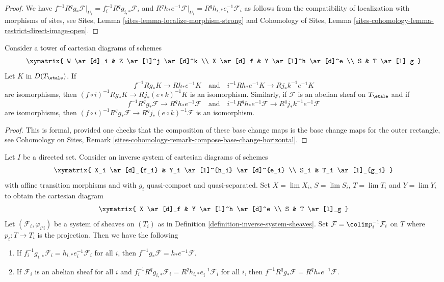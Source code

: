\begin{proof}
We have
$f^{-1}R^qg_*\mathcal{F}|_{U_i} = f_i^{-1}R^qg_{i, *}\mathcal{F}_i$
and
$R^qh_*e^{-1}\mathcal{F}|_{U_i} = R^qh_{i, *}e_i^{-1}\mathcal{F}_i$
as follows from the compatibility of localization with
morphisms of sites, see
Sites, Lemma \ref{sites-lemma-localize-morphism-strong}
and
Cohomology of Sites, Lemma
\ref{sites-cohomology-lemma-restrict-direct-image-open}.
\end{proof}

\begin{lemma}
\label{lemma-base-change-compose}
Consider a tower of cartesian diagrams of schemes
$$
\xymatrix{
W \ar[d]_i & Z \ar[l]^j \ar[d]^k \\
X \ar[d]_f & Y \ar[l]^h \ar[d]^e \\
S & T \ar[l]_g
}
$$
Let $K$ in $D(T_\etale)$. If
$$
f^{-1}Rg_*K \to Rh_*e^{-1}K
\quad\text{and}\quad
i^{-1}Rh_*e^{-1}K \to Rj_*k^{-1}e^{-1}K
$$
are isomorphisms, then
$(f \circ i)^{-1}Rg_*K \to Rj_*(e \circ k)^{-1}K$
is an isomorphism.
Similarly, if $\mathcal{F}$ is an abelian sheaf on $T_\etale$ and if
$$
f^{-1}R^qg_*\mathcal{F} \to R^qh_*e^{-1}\mathcal{F}
\quad\text{and}\quad
i^{-1}R^qh_*e^{-1}\mathcal{F} \to R^qj_*k^{-1}e^{-1}\mathcal{F}
$$
are isomorphisms, then
$(f \circ i)^{-1}R^qg_*\mathcal{F} \to R^qj_*(e \circ k)^{-1}\mathcal{F}$
is an isomorphism.
\end{lemma}

\begin{proof}
This is formal, provided one checks that the composition of these
base change maps is the base change maps for the outer rectangle, see
Cohomology on Sites, Remark
\ref{sites-cohomology-remark-compose-base-change-horizontal}.
\end{proof}

\begin{lemma}
\label{lemma-base-change-Rf-star-colim}
Let $I$ be a directed set. Consider an inverse system of
cartesian diagrams of schemes
$$
\xymatrix{
X_i \ar[d]_{f_i} & Y_i \ar[l]^{h_i} \ar[d]^{e_i} \\
S_i & T_i \ar[l]_{g_i}
}
$$
with affine transition morphisms and with $g_i$ quasi-compact and
quasi-separated. Set $X = \lim X_i$,
$S = \lim S_i$, $T = \lim T_i$ and $Y = \lim Y_i$ to
obtain the cartesian diagram
$$
\xymatrix{
X \ar[d]_f & Y \ar[l]^h \ar[d]^e \\
S & T \ar[l]_g
}
$$
Let $(\mathcal{F}_i, \varphi_{i'i})$ be a system of sheaves on
$(T_i)$ as in Definition \ref{definition-inverse-system-sheaves}. Set
$\mathcal{F} = \colim p_i^{-1}\mathcal{F}_i$ on $T$
where $p_i : T \to T_i$ is the projection.
Then we have the following
\begin{enumerate}
\item If $f_i^{-1}g_{i, *}\mathcal{F}_i = h_{i, *}e_i^{-1}\mathcal{F}_i$
for all $i$, then
$f^{-1}g_*\mathcal{F} = h_*e^{-1}\mathcal{F}$.
\item If $\mathcal{F}_i$ is an abelian sheaf for all $i$ and
$f_i^{-1}R^qg_{i, *}\mathcal{F}_i = R^qh_{i, *}e_i^{-1}\mathcal{F}_i$
for all $i$, then
$f^{-1}R^qg_*\mathcal{F} = R^qh_*e^{-1}\mathcal{F}$.
\end{enumerate}
\end{lemma}

